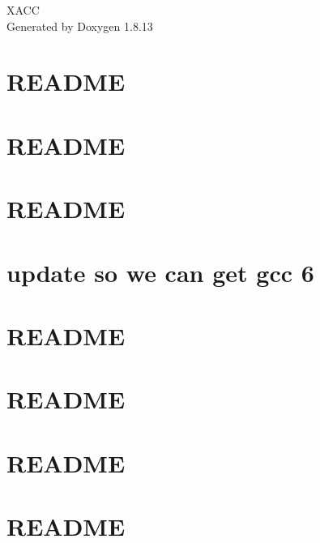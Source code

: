 \documentclass[twoside]{book}
\newcommand{\+}{\discretionary{\mbox{\scriptsize$\hookleftarrow$}}{}{}}
\newcommand{\clearemptydoublepage}{%
  \newpage{\pagestyle{empty}\cleardoublepage}%
}
\begin{document}
\hypersetup{pageanchor=false,
             bookmarksnumbered=true,
             pdfencoding=unicode
            }
\begin{titlepage}
\vspace*{7cm}
\begin{center}%
{\Large X\+A\+CC }\\
\vspace*{1cm}
{\large Generated by Doxygen 1.8.13}\\
\end{center}
\end{titlepage}
\clearemptydoublepage
{}
\tableofcontents
\clearemptydoublepage
{}
\hypersetup{pageanchor=true}

\chapter{R\+E\+A\+D\+ME}
\label{a01536}

\chapter{R\+E\+A\+D\+ME}
\label{a01537}

\chapter{R\+E\+A\+D\+ME}
\label{a01538}

\chapter{update so we can get gcc 6}
\label{a01539}

\chapter{R\+E\+A\+D\+ME}
\label{a01540}

\chapter{R\+E\+A\+D\+ME}
\label{a01541}

\chapter{R\+E\+A\+D\+ME}
\label{a01542}

\chapter{R\+E\+A\+D\+ME}
\label{a01543}

\end{document}
